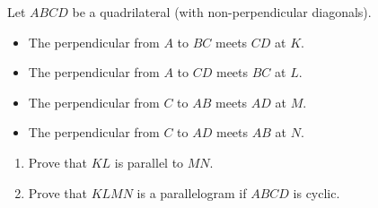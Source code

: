 \documentclass[varwidth]{standalone}
\begin{document}
    Let $ABCD$ be a quadrilateral (with non-perpendicular diagonals).
    \begin{itemize}
        \item The perpendicular from $A$ to $BC$ meets $CD$ at $K$.
        \item The perpendicular from $A$ to $CD$ meets $BC$ at $L$.
        \item The perpendicular from $C$ to $AB$ meets $AD$ at $M$.
        \item The perpendicular from $C$ to $AD$ meets $AB$ at $N$.
    \end{itemize}
    \begin{enumerate}[1.]
        \item Prove that $KL$ is parallel to $MN$.
        \item Prove that $KLMN$ is a parallelogram if $ABCD$ is cyclic.
    \end{enumerate}
\end{document}
